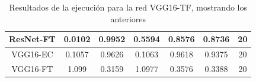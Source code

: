 \documentclass[11pt,a4paper]{article}
\theoremstyle{definition}
\begin{document}
\begin{table}[H]
\begin{tabular}{|c|c|c|c|c|c|c|}
\hline
ResNet-FT                                           & \textcolor[rgb]{0.129,0.129,0.129}{0.0102 } & \textcolor[rgb]{0.129,0.129,0.129}{0.9952 } & \textcolor[rgb]{0.129,0.129,0.129}{0.5594 }                                                                       & \textcolor[rgb]{0.129,0.129,0.129}{0.8576}                                                                             & \textcolor[rgb]{0.129,0.129,0.129}{0.8736}                                                                       & 20                                                                                                              \\
\hline
VGG16-EC                                               & \textcolor[rgb]{0.129,0.129,0.129}{0.1057 } & \textcolor[rgb]{0.129,0.129,0.129}{0.9626 } & \textcolor[rgb]{0.129,0.129,0.129}{0.1063 }                                                                       & \textcolor[rgb]{0.129,0.129,0.129}{0.9618}                                                                             & \textcolor[rgb]{0.129,0.129,0.129}{0.9375}                                                                       & 20                                                                                                              \\
\hline
\rowcolor{green} VGG16-FT                           & \textcolor[rgb]{0.129,0.129,0.129}{1.099}   & \textcolor[rgb]{0.129,0.129,0.129}{0.3159 } & \textcolor[rgb]{0.129,0.129,0.129}{1.0977 }                                                                       & \textcolor[rgb]{0.129,0.129,0.129}{0.3576}                                                                             & \textcolor[rgb]{0.129,0.129,0.129}{0.3388}                                                                       & 20                                                                                                              \\
\hline
\end{tabular}
\caption{Resultados de la ejecución para la red VGG16-TF, mostrando los anteriores}
\end{table}
\end{document}
